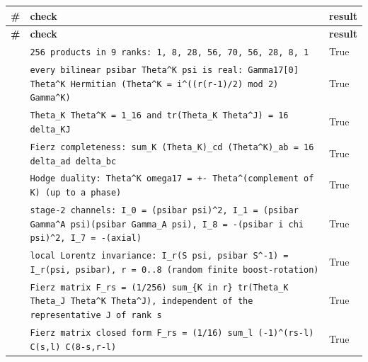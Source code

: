 \documentclass[10pt,a4paper]{article}
\begin{document}
{\footnotesize
\begin{longtable}{>{\raggedright\arraybackslash}p{}>{\raggedright\arraybackslash}p{}>{\raggedright\arraybackslash}p{}}
\toprule
\textbf{\#} & \textbf{check} & \textbf{result} \\
\midrule\endfirsthead
\toprule
\textbf{\#} & \textbf{check} & \textbf{result} \\
\midrule\endhead
\endfoot
\bottomrule\endlastfoot
1 & \texttt{256 products in 9 ranks: 1, 8, 28, 56, 70, 56, 28, 8, 1} & True \\
2 & \texttt{every bilinear psibar Theta\textasciicircum{}K psi is real: Gamma17[0] Theta\textasciicircum{}K Hermitian (Theta\textasciicircum{}K = i\textasciicircum{}((r(r-1)/\allowbreak{}2) mod 2) Gamma\textasciicircum{}K)} & True \\
3 & \texttt{Theta\_\allowbreak{}K Theta\textasciicircum{}K = 1\_\allowbreak{}16 and tr(Theta\_\allowbreak{}K Theta\textasciicircum{}J) = 16 delta\_\allowbreak{}KJ} & True \\
4 & \texttt{Fierz completeness: sum\_\allowbreak{}K (Theta\_\allowbreak{}K)\_\allowbreak{}cd (Theta\textasciicircum{}K)\_\allowbreak{}ab = 16 delta\_\allowbreak{}ad delta\_\allowbreak{}bc} & True \\
5 & \texttt{Hodge duality: Theta\textasciicircum{}K omega17 = +- Theta\textasciicircum{}(complement of K) (up to a phase)} & True \\
6 & \texttt{stage-2 channels: I\_\allowbreak{}0 = (psibar psi)\textasciicircum{}2, I\_\allowbreak{}1 = (psibar Gamma\textasciicircum{}A psi)(psibar Gamma\_\allowbreak{}A psi), I\_\allowbreak{}8 = -(psibar i chi psi)\textasciicircum{}2, I\_\allowbreak{}7 = -(axial)} & True \\
7 & \texttt{local Lorentz invariance: I\_\allowbreak{}r(S psi, psibar S\textasciicircum{}-1) = I\_\allowbreak{}r(psi, psibar), r = 0..8 (random finite boost-rotation)} & True \\
8 & \texttt{Fierz matrix F\_\allowbreak{}rs = (1/\allowbreak{}256) sum\_\allowbreak{}\{K in r\} tr(Theta\_\allowbreak{}K Theta\_\allowbreak{}J Theta\textasciicircum{}K Theta\textasciicircum{}J), independent of the representative J of rank s} & True \\
9 & \texttt{Fierz matrix closed form F\_\allowbreak{}rs = (1/\allowbreak{}16) sum\_\allowbreak{}l (-1)\textasciicircum{}(rs-l) C(s,l) C(8-s,r-l)} & True \\

\end{longtable}}
\end{document}
